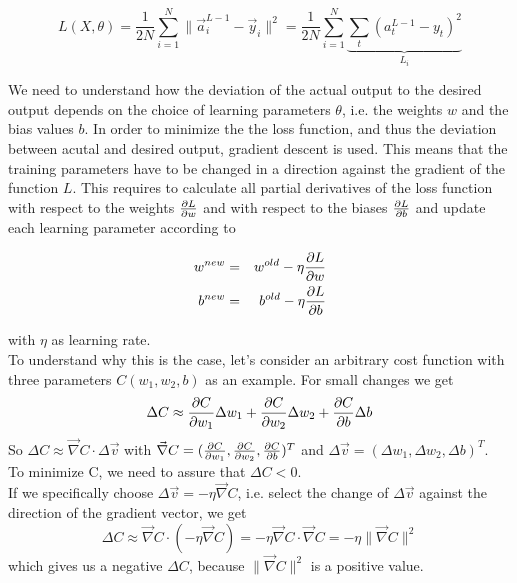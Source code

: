 \begin{equation}
    L(X,\theta) = \frac{1}{2N} \sum_{i=1}^{N}{\lVert \vec{a}^{L-1}_i - \vec{y}_i \rVert^2}
    = \frac{1}{2N} \sum_{i=1}^{N}{\underbrace{\sum_{t}{(a^{L-1}_t - y_t)^2}}_{L_i}}
    \label{eq:mse_loss_func}
\end{equation}

We need to understand how the deviation of the actual output to the desired output depends
on the choice of learning parameters $\theta$, i.e. the weights $w$ and the bias values
$b$. In order to minimize the the loss function, and thus the deviation between acutal and
desired output, gradient descent is used. This means that the training parameters have to
be changed in a direction against the gradient of the function $L$. This requires to
calculate all partial derivatives of the loss function with respect to the weights
$\frac{\partial {L}}{\partial {w}}$ and with respect to the biases $\frac{\partial {L}}{\partial {b}}$ and update each learning parameter
according to

\begin{eqnarray}
    w^{new} & = &  w^{old} - \eta \frac{\partial {L}}{\partial {w}} \\
    b^{new} & = &  b^{old} - \eta \frac{\partial {L}}{\partial {b}}
    \label{eq:update_weights_and_bias}
\end{eqnarray}

with $\eta$ as learning rate.\\

To understand why this is the case, let's consider an arbitrary cost function with three
parameters $C(w_1,w_2,b)$ as an example. For small changes we get
\begin{equation}
    \Delta C \approx \frac{\partial {C}}{\partial {w_1}}\Delta w_1 + \frac{\partial {C}}{\partial {w_2}}\Delta w_2 +\frac{\partial {C}}{\partial {b}}\Delta b
\end{equation}
So $\Delta C \approx \vec{\nabla} C \cdot \Delta \vec{v}$ with $\vec{\nabla} C =
(\frac{\partial {C}}{\partial {w_1}}, \frac{\partial {C}}{\partial {w_2}}, \frac{\partial {C}}{\partial {b}})^T$ and $\Delta \vec{v} = (\Delta w_1, \Delta w_2,
\Delta b)^T$.\\

To minimize C, we need to assure that $\Delta C < 0$. \\

If we specifically choose $\Delta \vec{v} = -\eta \vec{\nabla} C$, i.e. select the change
of $\Delta \vec{v}$ against the direction of the gradient vector, we get
\begin{equation}
    \Delta C \approx \vec{\nabla} C \cdot (-\eta \vec{\nabla} C)
    = -\eta \vec{\nabla} C \cdot \vec{\nabla} C
    = -\eta \lVert \vec{\nabla} C \rVert ^2
\end{equation}
which gives us a negative $\Delta C$, because $\lVert \vec{\nabla} C \rVert ^2$ is a
positive value. \\

